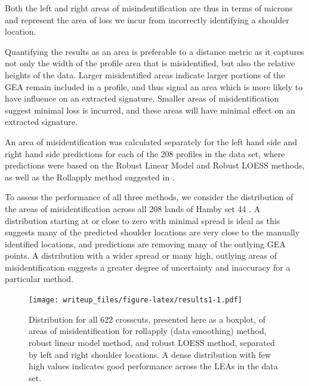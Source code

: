 \documentclass[12pt]{article}
\begin{document}
Both the left and right areas of misindentification are thus in terms of
microns and represent the area of loss we incur from incorrectly
identifying a shoulder location.

Quantifying the results as an area is preferable to a distance metric as
it captures not only the width of the profile area that is
misidentified, but also the relative heights of the data. Larger
misidentified areas indicate larger portions of the GEA remain included
in a profile, and thus signal an area which is more likely to have
influence on an extracted signature. Smaller areas of misidentification
suggest minimal loss is incurred, and these areas will have minimal
effect on an extracted signature.

An area of misidentification was calculated separately for the left hand
side and right hand side predictions for each of the 208
{\color{teal}{+414}} profiles in the data set, where predictions were
based on the Robust Linear Model and Robust LOESS methods, as well as
the Rollapply method suggested in \citet{Hare1}.

To assess the performance of all three methods, we consider the
distribution of the areas of misidentification across all 208
{\color{teal}{+414}} lands of Hamby set 44
{\color{teal}{and Houston-test}}.
{}
A distribution starting at or close to zero with minimal spread is ideal
as this suggests many of the predicted shoulder locations are very close
to the manually identified locations, and predictions are removing many
of the outlying GEA points. A distribution with a wider spread or many
high, outlying areas of misidentification suggests a greater degree of
uncertainty and inaccuracy for a particular method.
{\color{teal}{Some of the outliers are so extreme, statistics appear very close to one another or on top of each other.}}

\begin{figure}
\centering
\texttt{[image: writeup\_files/figure-latex/results1-1.pdf]}
\caption{\label{results1}Distribution for all 622 crosscuts, presented
here as a boxplot, of areas of misidentification for rollapply (data
smoothing) method, robust linear model method, and robust LOESS method,
separated by left and right shoulder locations. A dense distribution
with few high values indicates good performance across the LEAs in the
data set.}
\end{figure}
\end{document}
